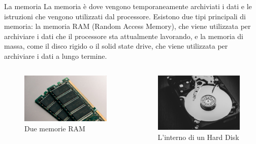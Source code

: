 \begin{frame}
	
	\begin{block}{La memoria}
		La memoria è dove vengono temporaneamente archiviati i dati e le istruzioni che vengono utilizzati dal processore. Esistono due tipi principali di memoria: la memoria RAM (Random Access Memory), che viene utilizzata per archiviare i dati che il processore sta attualmente lavorando, e la memoria di massa, come il disco rigido o il solid state drive, che viene utilizzata per archiviare i dati a lungo termine.
	\end{block}
	
	\begin{columns}			
		\begin{figure}[!htbp] 
			\centering
			\includegraphics[width=1.0\linewidth]{images/2_le_architetture/memory_ram.jpg}
			\caption{Due memorie RAM}
			\label{fig:memory_ram}
		\end{figure}
					
		\begin{figure}[!htbp] 
			\centering
			\includegraphics[width=0.85\linewidth]{images/2_le_architetture/memory_hdd.jpg}
			\caption{L'interno di un Hard Disk}
			\label{fig:memory_hdd}
		\end{figure}
		
	\end{columns}
	
\end{frame}


